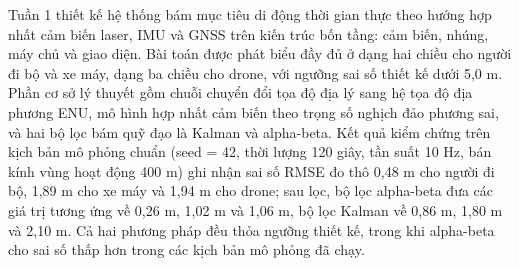 \hspace{0.5cm} Tuần 1 thiết kế hệ thống bám mục tiêu di động thời gian thực theo hướng hợp nhất cảm biến laser, IMU và GNSS trên kiến trúc bốn tầng: cảm biến, nhúng, máy chủ và giao diện. Bài toán được phát biểu đầy đủ ở dạng hai chiều cho người đi bộ và xe máy, dạng ba chiều cho drone, với ngưỡng sai số thiết kế dưới 5,0 m. Phần cơ sở lý thuyết gồm chuỗi chuyển đổi tọa độ địa lý sang hệ tọa độ địa phương ENU, mô hình hợp nhất cảm biến theo trọng số nghịch đảo phương sai, và hai bộ lọc bám quỹ đạo là Kalman và alpha-beta. Kết quả kiểm chứng trên kịch bản mô phỏng chuẩn (seed = 42, thời lượng 120 giây, tần suất 10 Hz, bán kính vùng hoạt động 400 m) ghi nhận sai số RMSE đo thô 0,48 m cho người đi bộ, 1,89 m cho xe máy và 1,94 m cho drone; sau lọc, bộ lọc alpha-beta đưa các giá trị tương ứng về 0,26 m, 1,02 m và 1,06 m, bộ lọc Kalman về 0,86 m, 1,80 m và 2,10 m. Cả hai phương pháp đều thỏa ngưỡng thiết kế, trong khi alpha-beta cho sai số thấp hơn trong các kịch bản mô phỏng đã chạy.
